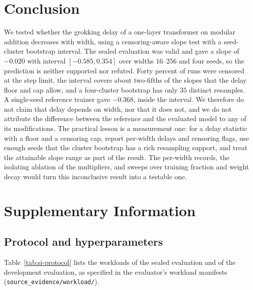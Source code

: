 \documentclass{article}
\begin{document}
\section{Conclusion}
\label{sec:conclusion}
We tested whether the grokking delay of a one-layer transformer on modular addition decreases with width, using a censoring-aware slope test with a seed-cluster bootstrap interval. The sealed evaluation was valid and gave a slope of $-0.020$ with interval $[-0.585, 0.354]$ over widths $16$--$256$ and four seeds, so the prediction is neither supported nor refuted. Forty percent of runs were censored at the step limit, the interval covers about two-fifths of the slopes that the delay floor and cap allow, and a four-cluster bootstrap has only $35$ distinct resamples. A single-seed reference trainer gave $-0.368$, inside the interval. We therefore do not claim that delay depends on width, nor that it does not, and we do not attribute the difference between the reference and the evaluated model to any of its modifications. The practical lesson is a measurement one: for a delay statistic with a floor and a censoring cap, report per-width delays and censoring flags, use enough seeds that the cluster bootstrap has a rich resampling support, and treat the attainable slope range as part of the result. The per-width records, the isolating ablation of the multipliers, and sweeps over training fraction and weight decay would turn this inconclusive result into a testable one.

\clearpage



\clearpage
\appendix
\section{Supplementary Information}

\subsection{Protocol and hyperparameters}
\label{sec:si-protocol}
Table~\ref{tab:si-protocol} lists the workloads of the sealed evaluation and of the development evaluation, as specified in the evaluator's workload manifests (\texttt{source\_evidence/workload/}).
\end{document}
